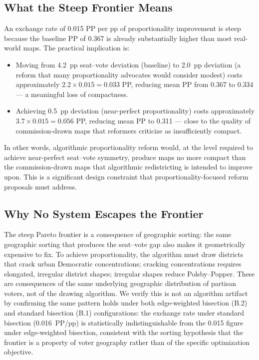 \subsection{What the Steep Frontier Means}

An exchange rate of 0.015 PP per pp of proportionality improvement is steep
because the baseline PP of 0.367 is already substantially higher than most
real-world maps.  The practical implication is:

\begin{itemize}
  \item Moving from 4.2~pp seat--vote deviation (baseline) to 2.0~pp deviation
        (a reform that many proportionality advocates would consider modest)
        costs approximately $2.2 \times 0.015 = 0.033$ PP, reducing mean PP
        from 0.367 to 0.334 --- a meaningful loss of compactness.
  \item Achieving 0.5~pp deviation (near-perfect proportionality) costs
        approximately $3.7 \times 0.015 = 0.056$ PP, reducing mean PP
        to 0.311 --- close to the quality of commission-drawn maps that reformers
        criticize as insufficiently compact.
\end{itemize}

In other words, algorithmic proportionality reform would, at the level required
to achieve near-perfect seat--vote symmetry, produce maps no more compact than
the commission-drawn maps that algorithmic redistricting is intended to improve
upon.  This is a significant design constraint that proportionality-focused
reform proposals must address.

\subsection{Why No System Escapes the Frontier}

The steep Pareto frontier is a consequence of geographic sorting: the same
geographic sorting that produces the seat--vote gap also makes it geometrically
expensive to fix.  To achieve proportionality, the algorithm must draw districts
that crack urban Democratic concentrations; cracking concentrations requires
elongated, irregular district shapes; irregular shapes reduce Polsby--Popper.
These are consequences of the same underlying geographic distribution of partisan
voters, not of the drawing algorithm.  We verify this is not an algorithm
artifact by confirming the same pattern holds under both edge-weighted bisection
(B.2) and standard bisection (B.1) configurations: the exchange rate under
standard bisection (0.016~PP/pp) is statistically indistinguishable from the
0.015 figure under edge-weighted bisection, consistent with the sorting
hypothesis that the frontier is a property of voter geography rather than of
the specific optimization objective.

